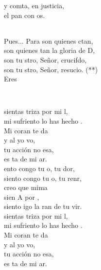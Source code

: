 \documentclass[12pt]{article}
\begin{document}
\begin{multicols*}{2}
\begin{cancion}
	y comta, en justicia, \\
	el pan con os.\\\jump\\
	\begin{chorus}%
	Pues... Para  son quienes ctan,\\
	son quienes tan la gloria de D,\\
	son tu stro, Señor, crucifdo,\\
	son tu stro, Señor, resucio. (**)\\
	Eres  \\
	\end{chorus}%
	\jump\\
\end{cancion}%

\begin{cancion}%
	 sientas  triza por mi l, \\
	mi sufriento lo has hecho . \\
	Mi coran te da \\
	y al yo vo, \\
	tu acción no esa,\\
	es ta de mi ar.\\
	ento congo tu o, tu dor,\\
	siento congo tu o, tu renr,\\
	creo que mima \\
	sien A por ,\\
	siento igo la ran de tu vir.\\
	 sientas  triza por mi l, \\
	mi sufriento lo has hecho . \\
	Mi coran te da \\
	y al yo vo, \\
	tu acción no esa,\\
	es ta de mi ar.\\
\end{cancion}%


\end{multicols*}
\end{document}
